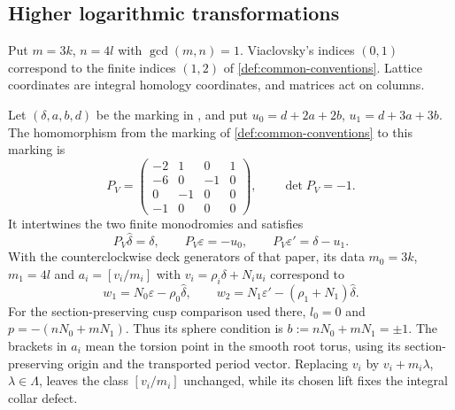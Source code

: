 \subsection{Higher logarithmic transformations}\hypertarget{tag-02ZE}{}\label{push:section:E.1}
\begin{definition}
\hypertarget{tag-IP10}{}\label{I:def:higher-multiplicity-coordinates}
Put $m=3k$, $n=4l$ with $\gcd(m,n)=1$.
Viaclovsky's indices $(0,1)$ correspond to the finite indices $(1,2)$
of \cref{def:common-conventions}. Lattice coordinates are integral
homology coordinates, and matrices act on columns.
\end{definition}

\begin{proposition}\hypertarget{tag-032R}{}\label{push:src:E.1.1}

Let $(\delta,a,b,d)$ be the marking in
\cite[Section~2, equations~(2.1)--(2.2), p.~3, and (2.7), (2.11)--(2.12), p.~4]{ViaclovskyLog2026},
and put $u_0=d+2a+2b$, $u_1=d+3a+3b$.
The homomorphism from the marking of \cref{def:common-conventions} to this marking is
\[
 P_V=\begin{pmatrix}
 -2&1&0&1\\-6&0&-1&0\\0&-1&0&0\\-1&0&0&0
 \end{pmatrix},\qquad \det P_V=-1.
\]
It intertwines the two finite monodromies and satisfies
\[
 P_V\widehat\delta=\delta,\qquad
 P_V\varepsilon=-u_0,\qquad
 P_V\varepsilon'=\delta-u_1.
\]
With the counterclockwise deck generators of that paper, its data
$m_0=3k$, $m_1=4l$ and
$a_i=[v_i/m_i]$ with $v_i=\rho_i\delta+N_i u_i$ correspond to
\[
 w_1=N_0\varepsilon-\rho_0\widehat\delta,
 \qquad
 w_2=N_1\varepsilon'-(\rho_1+N_1)\widehat\delta.
\]
For the section-preserving cusp comparison used there, $l_0=0$ and
$p=-(nN_0+mN_1)$.  Thus its sphere condition is
$b:=nN_0+mN_1=\pm1$.
The brackets in $a_i$ mean the torsion point in the smooth
root torus, using its section-preserving origin and the
transported period vector.  Replacing $v_i$ by $v_i+m_i\lambda$, $\lambda\in\Lambda$,
leaves the class $[v_i/m_i]$ unchanged, while its chosen lift fixes the integral collar defect.
\end{proposition}


